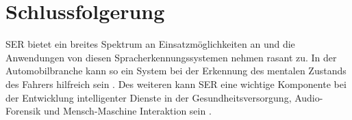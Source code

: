 \chapter{Schlussfolgerung}

SER bietet ein breites Spektrum an Einsatzmöglichkeiten an und die Anwendungen von diesen Spracherkennungssystemen nehmen rasant zu. In der Automobilbranche kann so ein System bei der Erkennung des mentalen Zustands des Fahrers hilfreich sein \cite{badshah2019deep}. Des weiteren kann SER eine wichtige Komponente bei der Entwicklung intelligenter Dienste in der Gesundheitsversorgung, Audio-Forensik und Mensch-Maschine Interaktion sein \cite{badshah2019deep}.
